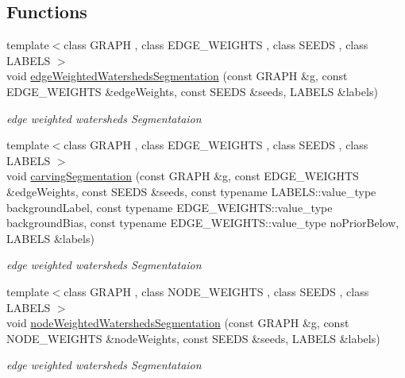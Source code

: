 \subsection*{Functions}
\begin{DoxyCompactItemize}
\item 
{\footnotesize template$<$class G\+R\+A\+PH , class E\+D\+G\+E\+\_\+\+W\+E\+I\+G\+H\+TS , class S\+E\+E\+DS , class L\+A\+B\+E\+LS $>$ }\\void \hyperlink{namespacenifty_1_1graph_a3e294171c18ca5e524f85c9341ef2f5e}{edge\+Weighted\+Watersheds\+Segmentation} (const G\+R\+A\+PH \&g, const E\+D\+G\+E\+\_\+\+W\+E\+I\+G\+H\+TS \&edge\+Weights, const S\+E\+E\+DS \&seeds, L\+A\+B\+E\+LS \&labels)
\begin{DoxyCompactList}\small\item\em edge weighted watersheds Segmentataion \end{DoxyCompactList}\item 
{\footnotesize template$<$class G\+R\+A\+PH , class E\+D\+G\+E\+\_\+\+W\+E\+I\+G\+H\+TS , class S\+E\+E\+DS , class L\+A\+B\+E\+LS $>$ }\\void \hyperlink{namespacenifty_1_1graph_a428250605a1a1f6fc93fd6aac965b931}{carving\+Segmentation} (const G\+R\+A\+PH \&g, const E\+D\+G\+E\+\_\+\+W\+E\+I\+G\+H\+TS \&edge\+Weights, const S\+E\+E\+DS \&seeds, const typename L\+A\+B\+E\+L\+S\+::value\+\_\+type background\+Label, const typename E\+D\+G\+E\+\_\+\+W\+E\+I\+G\+H\+T\+S\+::value\+\_\+type background\+Bias, const typename E\+D\+G\+E\+\_\+\+W\+E\+I\+G\+H\+T\+S\+::value\+\_\+type no\+Prior\+Below, L\+A\+B\+E\+LS \&labels)
\begin{DoxyCompactList}\small\item\em edge weighted watersheds Segmentataion \end{DoxyCompactList}\item 
{\footnotesize template$<$class G\+R\+A\+PH , class N\+O\+D\+E\+\_\+\+W\+E\+I\+G\+H\+TS , class S\+E\+E\+DS , class L\+A\+B\+E\+LS $>$ }\\void \hyperlink{namespacenifty_1_1graph_a5f2f2483c8ff3c80f1597b4d206a65b2}{node\+Weighted\+Watersheds\+Segmentation} (const G\+R\+A\+PH \&g, const N\+O\+D\+E\+\_\+\+W\+E\+I\+G\+H\+TS \&node\+Weights, const S\+E\+E\+DS \&seeds, L\+A\+B\+E\+LS \&labels)
\begin{DoxyCompactList}\small\item\em edge weighted watersheds Segmentataion \end{DoxyCompactList}\item 

\end{DoxyCompactItemize}
